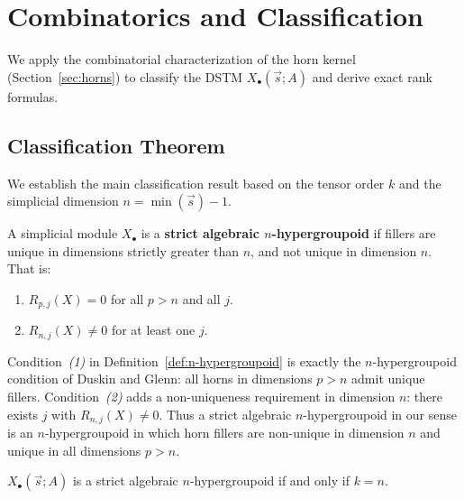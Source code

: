 
\section{Combinatorics and Classification}
\label{sec:combinatorics}

We apply the combinatorial characterization of the horn kernel (Section~\ref{sec:horns}) to classify the DSTM $X_\bullet(\vec s; A)$ and derive exact rank formulas.

\subsection{Classification Theorem}

We establish the main classification result based on the tensor order $k$ and the simplicial dimension $n=\min(\vec{s})-1$.


\begin{definition}\label{def:n-hypergroupoid}
A simplicial module $X_\bullet$ is a \textbf{strict algebraic $n$-hypergroupoid} if fillers are unique in dimensions strictly greater than $n$, and not unique in dimension $n$. That is:
\begin{enumerate}
    \item $R_{p,j}(X) = 0$ for all $p>n$ and all $j$.
    \item $R_{n,j}(X) \ne 0$ for at least one $j$.
\end{enumerate}
\end{definition}


\begin{remark}\label{rem:nlab-hypergroupoid}
Condition~\emph{(1)} in Definition~\ref{def:n-hypergroupoid} is exactly the
$n$-hypergroupoid condition of Duskin and Glenn:
all horns in dimensions $p>n$ admit unique fillers. Condition~\emph{(2)}
adds a non-uniqueness requirement in dimension $n$: there exists $j$ with
$R_{n,j}(X)\neq 0$. Thus a strict algebraic $n$-hypergroupoid in our sense is
an $n$-hypergroupoid in which horn fillers are non-unique in dimension $n$
and unique in all dimensions $p>n$.
\end{remark}


\begin{theorem}\label{thm:classification}
$X_\bullet(\vec{s};A)$ is a strict algebraic $n$-hypergroupoid if and only if $k=n$.
\end{theorem}

